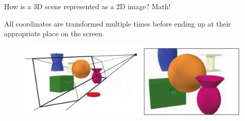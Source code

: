 \documentclass[10pt]{beamer}
\begin{document}
{ %
\begin{frame}{How is a 3D scene represented as a 2D image?}
  Math!

  All coordinates are transformed multiple times before ending up at their appropriate place on the screen.

  \begin{figure}
    \includegraphics[width=\textwidth]{rtr_fig2_1.png}
  \end{figure}

\end{frame}}



\end{document}
